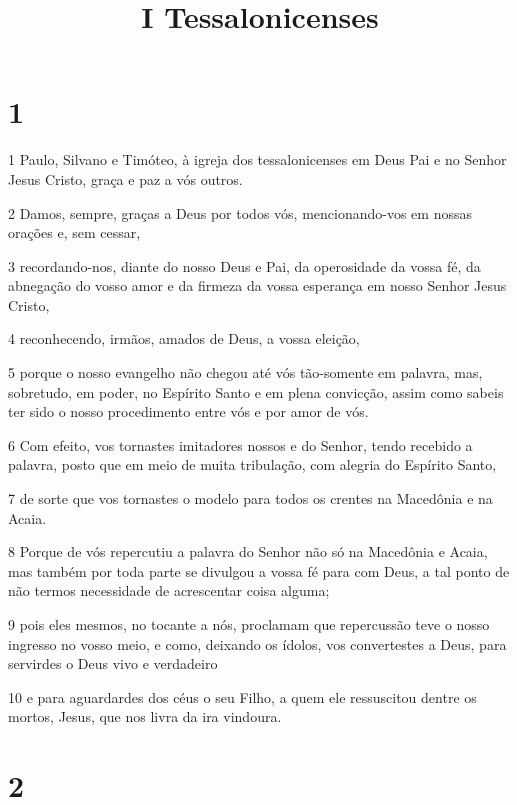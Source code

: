 

\title{I Tessalonicenses}


\chapter{1}

\par 1 Paulo, Silvano e Timóteo, à igreja dos tessalonicenses em Deus Pai e no Senhor Jesus Cristo, graça e paz a vós outros.
\par 2 Damos, sempre, graças a Deus por todos vós, mencionando-vos em nossas orações e, sem cessar,
\par 3 recordando-nos, diante do nosso Deus e Pai, da operosidade da vossa fé, da abnegação do vosso amor e da firmeza da vossa esperança em nosso Senhor Jesus Cristo,
\par 4 reconhecendo, irmãos, amados de Deus, a vossa eleição,
\par 5 porque o nosso evangelho não chegou até vós tão-somente em palavra, mas, sobretudo, em poder, no Espírito Santo e em plena convicção, assim como sabeis ter sido o nosso procedimento entre vós e por amor de vós.
\par 6 Com efeito, vos tornastes imitadores nossos e do Senhor, tendo recebido a palavra, posto que em meio de muita tribulação, com alegria do Espírito Santo,
\par 7 de sorte que vos tornastes o modelo para todos os crentes na Macedônia e na Acaia.
\par 8 Porque de vós repercutiu a palavra do Senhor não só na Macedônia e Acaia, mas também por toda parte se divulgou a vossa fé para com Deus, a tal ponto de não termos necessidade de acrescentar coisa alguma;
\par 9 pois eles mesmos, no tocante a nós, proclamam que repercussão teve o nosso ingresso no vosso meio, e como, deixando os ídolos, vos convertestes a Deus, para servirdes o Deus vivo e verdadeiro
\par 10 e para aguardardes dos céus o seu Filho, a quem ele ressuscitou dentre os mortos, Jesus, que nos livra da ira vindoura.

\chapter{2}

